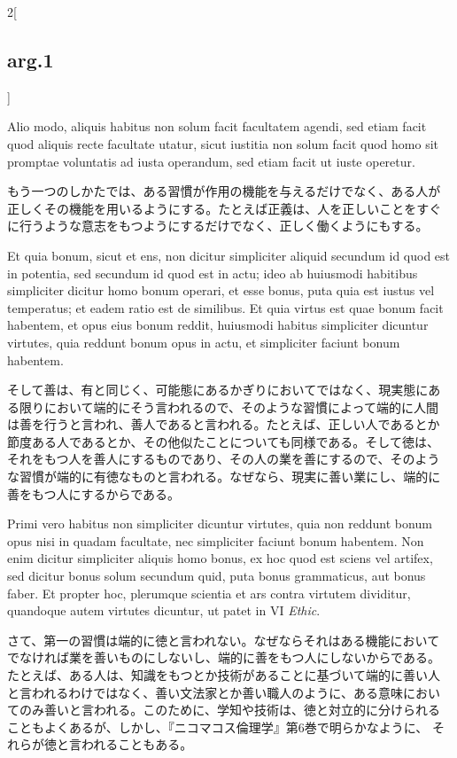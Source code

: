 \documentclass[paper=a4paper,fontsize=10pt,jafontsize=9pt,titlepage]{jlreq}
\begin{document}
\begin{paracol}{2}[\subsection{arg.1}]
\switchcolumn*

Alio modo, aliquis habitus non solum facit facultatem agendi,
sed etiam facit quod aliquis recte facultate utatur, sicut iustitia
non solum facit quod homo sit promptae voluntatis ad iusta operandum,
sed etiam facit ut iuste operetur.

\switchcolumn

もう一つのしかたでは、ある習慣が作用の機能を与えるだけでなく、ある人が
正しくその機能を用いるようにする。たとえば正義は、人を正しいことをすぐ
に行うような意志をもつようにするだけでなく、正しく働くようにもする。

\switchcolumn*

Et quia bonum, sicut et ens, non
dicitur simpliciter aliquid secundum id quod est in potentia, sed
secundum id quod est in actu; ideo ab huiusmodi habitibus simpliciter
dicitur homo bonum operari, et esse bonus, puta quia est iustus vel
temperatus; et eadem ratio est de similibus. Et quia virtus est quae
bonum facit habentem, et opus eius bonum reddit, huiusmodi habitus
simpliciter dicuntur virtutes, quia reddunt bonum opus in actu, et
simpliciter faciunt bonum habentem.

\switchcolumn

そして善は、有と同じく、可能態にあるかぎりにおいてではなく、現実態にあ
る限りにおいて端的にそう言われるので、そのような習慣によって端的に人間
は善を行うと言われ、善人であると言われる。たとえば、正しい人であるとか
節度ある人であるとか、その他似たことについても同様である。そして徳は、
それをもつ人を善人にするものであり、その人の業を善にするので、そのよう
な習慣が端的に有徳なものと言われる。なぜなら、現実に善い業にし、端的に
善をもつ人にするからである。

\switchcolumn*

Primi vero habitus non simpliciter dicuntur virtutes, quia non reddunt
bonum opus nisi in quadam facultate, nec simpliciter faciunt bonum
habentem. Non enim dicitur simpliciter aliquis homo bonus, ex hoc quod
est sciens vel artifex, sed dicitur bonus solum secundum quid, puta
bonus grammaticus, aut bonus faber. Et propter hoc, plerumque scientia
et ars contra virtutem dividitur, quandoque autem virtutes dicuntur,
ut patet in VI {\itshape Ethic}.

\switchcolumn

さて、第一の習慣は端的に徳と言われない。なぜならそれはある機能において
でなければ業を善いものにしないし、端的に善をもつ人にしないからである。
たとえば、ある人は、知識をもつとか技術があることに基づいて端的に善い人
と言われるわけではなく、善い文法家とか善い職人のように、ある意味におい
てのみ善いと言われる。このために、学知や技術は、徳と対立的に分けられる
こともよくあるが、しかし、『ニコマコス倫理学』第6巻で明らかなように、
それらが徳と言われることもある。


\end{paracol}
\end{document}
